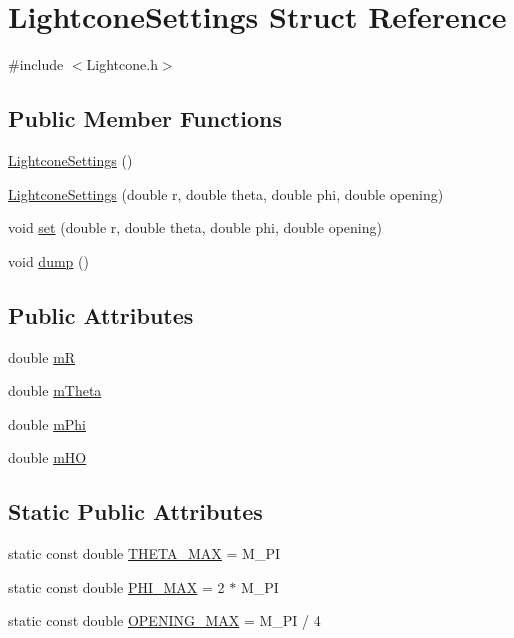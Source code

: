 \hypertarget{structLightconeSettings}{}\section{Lightcone\+Settings Struct Reference}
\label{structLightconeSettings}


{\ttfamily \#include $<$Lightcone.\+h$>$}

\subsection*{Public Member Functions}
\begin{DoxyCompactItemize}
\item 
\hyperlink{structLightconeSettings_a819d92e610bcaeb64d700bf04ba80bdf}{Lightcone\+Settings} ()
\item 
\hyperlink{structLightconeSettings_a67e62da8d103761add3479ec1ada892a}{Lightcone\+Settings} (double r, double theta, double phi, double opening)
\item 
void \hyperlink{structLightconeSettings_a6349d6f0c8e225cf47988a02a8d48152}{set} (double r, double theta, double phi, double opening)
\item 
void \hyperlink{structLightconeSettings_a8750403e5d117e5842a3261f83e9721e}{dump} ()
\end{DoxyCompactItemize}
\subsection*{Public Attributes}
\begin{DoxyCompactItemize}
\item 
double \hyperlink{structLightconeSettings_aeff96d043c5d6a91aaa682fdc0f1bcdc}{m\+R}
\item 
double \hyperlink{structLightconeSettings_a65ddb1d59b467d53f9df135fb5530008}{m\+Theta}
\item 
double \hyperlink{structLightconeSettings_ac325b952ef76bbcdcf061a7fb1abda89}{m\+Phi}
\item 
double \hyperlink{structLightconeSettings_acea8dd48773c7fe53b428ce3daf9767f}{m\+H\+O}
\end{DoxyCompactItemize}
\subsection*{Static Public Attributes}
\begin{DoxyCompactItemize}
\item 
static const double \hyperlink{structLightconeSettings_adc80dcb7ac50ce4ddb5fe1d0146f3006}{T\+H\+E\+T\+A\+\_\+\+M\+A\+X} = M\+\_\+\+P\+I
\item 
static const double \hyperlink{structLightconeSettings_a482009f7c776c60272434870fd10a5e9}{P\+H\+I\+\_\+\+M\+A\+X} = 2 $\ast$ M\+\_\+\+P\+I
\item 
static const double \hyperlink{structLightconeSettings_a84fe32a28ec1c71f5131bf79dde76b77}{O\+P\+E\+N\+I\+N\+G\+\_\+\+M\+A\+X} = M\+\_\+\+P\+I / 4
\end{DoxyCompactItemize}


